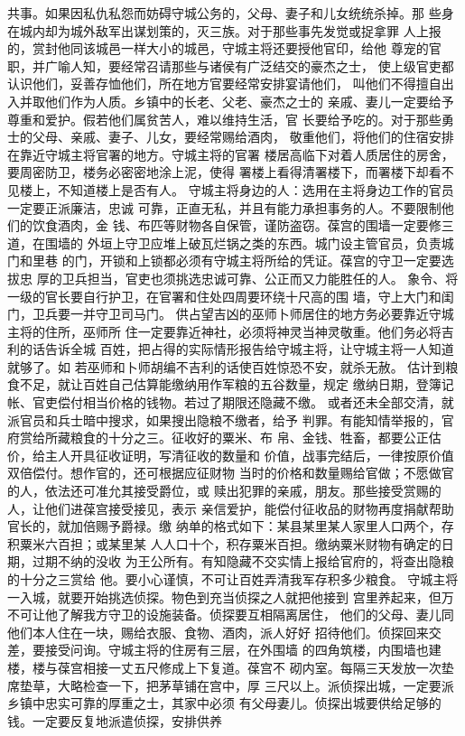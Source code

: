 \documentclass[12pt,UTF8]{ctexbook}
\begin{document}
共事。如果因私仇私怨而妨碍守城公务的，父母、妻子和儿女统统杀掉。那 
些身在城内却为城外敌军出谋划策的，灭三族。对于那些事先发觉或捉拿罪 
人上报的，赏封他同该城邑一样大小的城邑，守城主将还要授他官印，给他 
尊宠的官职，并广喻人知，要经常召请那些与诸侯有广泛结交的豪杰之士， 
使上级官吏都认识他们，妥善存恤他们，所在地方官要经常安排宴请他们， 
叫他们不得擅自出入并取他们作为人质。乡镇中的长老、父老、豪杰之士的 
亲戚、妻儿一定要给予尊重和爱护。假若他们属贫苦人，难以维持生活，官 
长要给予吃的。对于那些勇士的父母、亲戚、妻子、儿女，要经常赐给酒肉， 
敬重他们，将他们的住宿安排在靠近守城主将官署的地方。守城主将的官署 
楼居高临下对着人质居住的房舍，要周密防卫，楼务必密密地涂上泥，使得 
署楼上看得清署楼下，而署楼下却看不见楼上，不知道楼上是否有人。 
守城主将身边的人：选用在主将身边工作的官员一定要正派廉洁，忠诚 
可靠，正直无私，并且有能力承担事务的人。不要限制他们的饮食酒肉，金 
钱、布匹等财物各自保管，谨防盗窃。葆宫的围墙一定要修三道，在围墙的 
外垣上守卫应堆上破瓦烂锅之类的东西。城门设主管官员，负责城门和里巷 
的门，开锁和上锁都必须有守城主将所给的凭证。葆宫的守卫一定要选拔忠 
厚的卫兵担当，官吏也须挑选忠诚可靠、公正而又力能胜任的人。 
象令、将一级的官长要自行护卫，在官署和住处四周要环绕十尺高的围 
墙，守上大门和闺门，卫兵要一并守卫司马门。 
供占望吉凶的巫师卜师居住的地方务必要靠近守城主将的住所，巫师所 
住一定要靠近神社，必须将神灵当神灵敬重。他们务必将吉利的话告诉全城 
百姓，把占得的实际情形报告给守城主将，让守城主将一人知道就够了。如 
若巫师和卜师胡编不吉利的话使百姓惊恐不安，就杀无赦。 
估计到粮食不足，就让百姓自己估算能缴纳用作军粮的五谷数量，规定 
缴纳日期，登簿记帐、官吏偿付相当价格的钱物。若过了期限还隐藏不缴。 
或者还未全部交清，就派官员和兵士暗中搜求，如果搜出隐粮不缴者，给予 
判罪。有能知情举报的，官府赏给所藏粮食的十分之三。征收好的粟米、布 
帛、金钱、牲畜，都要公正估价，给主人开具征收证明，写清征收的数量和 
价值，战事完结后，一律按原价值双倍偿付。想作官的，还可根据应征财物 
当时的价格和数量赐给官做；不愿做官的人，依法还可准允其接受爵位，或 
赎出犯罪的亲戚，朋友。那些接受赏赐的人，让他们进葆宫接受接见，表示 
亲信爱护，能偿付征收品的财物再度捐献帮助官长的，就加倍赐予爵禄。缴 
纳单的格式如下：某县某里某人家里人口两个，存积粟米六百担；或某里某 
人人口十个，积存粟米百担。缴纳粟米财物有确定的日期，过期不纳的没收 
为王公所有。有知隐藏不交实情上报给官府的，将查出隐粮的十分之三赏给 
他。要小心谨慎，不可让百姓弄清我军存积多少粮食。 
守城主将一入城，就要开始挑选侦探。物色到充当侦探之人就把他接到 
宫里养起来，但万不可让他了解我方守卫的设施装备。侦探要互相隔离居住， 
他们的父母、妻儿同他们本人住在一块，赐给衣服、食物、酒肉，派人好好 
招待他们。侦探回来交差，要接受问询。守城主将的住房有三层，在外围墙 
的四角筑楼，内围墙也建楼，楼与葆宫相接一丈五尺修成上下复道。葆宫不 
砌内室。每隔三天发放一次垫席垫草，大略检查一下，把茅草铺在宫中，厚 
三尺以上。派侦探出城，一定要派乡镇中忠实可靠的厚重之士，其家中必须 
有父母妻儿。侦探出城要供给足够的钱。一定要反复地派遣侦探，安排供养 
\end{document}
